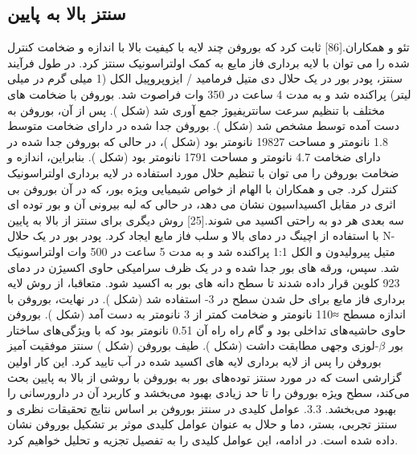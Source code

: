 \subsection{سنتز بالا به پایین}
تئو و همکاران.\cite{liScalableProductionFewLayer2018}[86] ثابت کرد که بوروفن چند لایه با کیفیت بالا با اندازه و ضخامت کنترل شده را می توان با لایه برداری فاز مایع به کمک اولتراسونیک سنتز کرد. در طول فرآیند سنتز، پودر بور در یک حلال دی متیل فرمامید  / ایزوپروپیل الکل  (1 میلی گرم در میلی لیتر) پراکنده شد و به مدت 4 ساعت در 350 وات فراصوت شد. بوروفن با ضخامت های مختلف با تنظیم سرعت سانتریفیوژ جمع آوری شد (شکل ). پس از آن، بوروفن به دست آمده توسط  مشخص شد (شکل ). بوروفن جدا شده در  دارای ضخامت متوسط 1.8 نانومتر و مساحت 19827 نانومتر بود (شکل )، در حالی که بوروفن جدا شده در  دارای ضخامت 4.7 نانومتر و مساحت 1791 نانومتر بود (شکل ). بنابراین، اندازه و ضخامت بوروفن را می توان با تنظیم حلال مورد استفاده در لایه برداری اولتراسونیک کنترل کرد. جی و همکاران با الهام از خواص شیمیایی ویژه بور، که در آن بوروفن بی اثری در مقابل اکسیداسیون نشان می دهد، در حالی که لبه بیرونی آن و بور توده ای سه بعدی هر دو به راحتی اکسید می شوند.\cite{jiNovelTopDownSynthesis2018}[25] روش دیگری برای سنتز از بالا به پایین با استفاده از اچینگ در دمای بالا و سلب فاز مایع ایجاد کرد. پودر بور در یک حلال N-متیل پیرولیدون  و الکل 1:1 پراکنده شد و به مدت 5 ساعت در 500 وات اولتراسونیک شد. سپس، ورقه های بور جدا شده و در یک ظرف سرامیکی حاوی اکسیژن در دمای 923 کلوین قرار داده شدند تا سطح دانه های بور به  اکسید شود. متعاقبا، از روش لایه برداری فاز مایع برای حل شدن سطح  در  3- استفاده شد (شکل ). در نهایت، بوروفن با اندازه مسطح ≈110 نانومتر و ضخامت کمتر از 3 نانومتر به دست آمد (شکل ). بوروفن حاوی حاشیه‌های تداخلی بود و گام راه راه آن 0.51 نانومتر بود که با ویژگی‌های ساختار بور $\beta$-لوزی وجهی مطابقت داشت (شکل ). طیف  بوروفن (شکل ) سنتز موفقیت آمیز بوروفن را پس از لایه برداری لایه های اکسید شده در آب تایید کرد. این کار اولین گزارشی است که در مورد سنتز توده‌های بور به بوروفن با روشی از بالا به پایین بحث می‌کند، سطح ویژه بوروفن را تا حد زیادی بهبود می‌بخشد و کاربرد آن در دارورسانی را بهبود می‌بخشد. 3.3. عوامل کلیدی در سنتز بوروفن بر اساس نتایج تحقیقات نظری و سنتز تجربی، بستر، دما و حلال به عنوان عوامل کلیدی موثر بر تشکیل بوروفن نشان داده شده است. در ادامه، این عوامل کلیدی را به تفصیل تجزیه و تحلیل خواهیم کرد.

